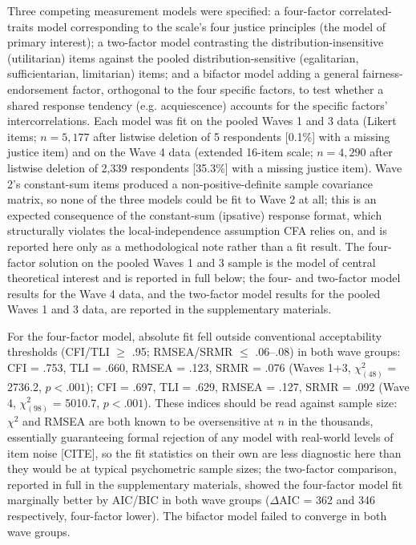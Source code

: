 \documentclass[10pt,letterpaper]{article}
\begin{document}
Three competing measurement models were specified: a four-factor correlated-traits model corresponding to the scale's four justice principles (the model of primary interest); a two-factor model contrasting the distribution-insensitive (utilitarian) items against the pooled distribution-sensitive (egalitarian, sufficientarian, limitarian) items; and a bifactor model adding a general fairness-endorsement factor, orthogonal to the four specific factors, to test whether a shared response tendency (e.g. acquiescence) accounts for the specific factors' intercorrelations.
Each model was fit on the pooled Waves 1 and 3 data (Likert items; $n = 5{,}177$ after listwise deletion of 5 respondents [0.1\%] with a missing justice item) and on the Wave 4 data (extended 16-item scale; $n = 4{,}290$ after listwise deletion of 2{,}339 respondents [35.3\%] with a missing justice item).
Wave 2's constant-sum items produced a non-positive-definite sample covariance matrix, so none of the three models could be fit to Wave 2 at all; this is an expected consequence of the constant-sum (ipsative) response format, which structurally violates the local-independence assumption CFA relies on, and is reported here only as a methodological note rather than a fit result.
The four-factor solution on the pooled Waves 1 and 3 sample is the model of central theoretical interest and is reported in full below; the four- and two-factor model results for the Wave 4 data, and the two-factor model results for the pooled Waves 1 and 3 data, are reported in the supplementary materials.

For the four-factor model, absolute fit fell outside conventional acceptability thresholds (CFI/TLI $\geq$ .95; RMSEA/SRMR $\leq$ .06--.08) in both wave groups: CFI = .753, TLI = .660, RMSEA = .123, SRMR = .076 (Waves 1+3, $\chi^2_{(48)}$ = 2736.2, $p<.001$); CFI = .697, TLI = .629, RMSEA = .127, SRMR = .092 (Wave 4, $\chi^2_{(98)}$ = 5010.7, $p<.001$).
These indices should be read against sample size: $\chi^2$ and RMSEA are both known to be oversensitive at $n$ in the thousands, essentially guaranteeing formal rejection of any model with real-world levels of item noise [CITE], so the fit statistics on their own are less diagnostic here than they would be at typical psychometric sample sizes; the two-factor comparison, reported in full in the supplementary materials, showed the four-factor model fit marginally better by AIC/BIC in both wave groups ($\Delta$AIC = 362 and 346 respectively, four-factor lower).
The bifactor model failed to converge in both wave groups.
\end{document}
